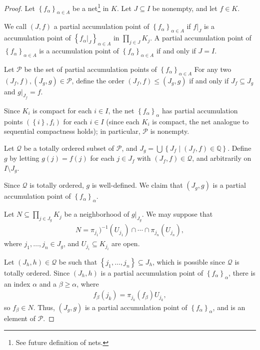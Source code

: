 \documentclass[10pt]{extarticle}
\newcommand{\Q}{\mathbb{Q}}
\newcommand{\set}[1]{\left\{#1\right\}}
\theoremstyle{plain}
\theoremstyle{definition}
\theoremstyle{note}
\renewcommand{\newline}{\hfill\break}
\begin{document}
\begin{proof}
  Let $\set{f_{\alpha}}_{\alpha\in A}$ be a net\footnote{See future definition of nets.} in $K$. Let $J\subseteq I$ be nonempty, and let $f\in K$.\newline

  We call $\left(J,f\right)$ a partial accumulation point of $\set{f_{\alpha}}_{\alpha \in A}$ if $f\vert_{J}$ is a accumulation point of $\set{f_{\alpha}\vert_{J}}_{\alpha \in A}$ in $\displaystyle \prod_{j\in J}K_j$. A partial accumulation point of $\set{f_{\alpha}}_{\alpha \in A}$ is a accumulation point of $\set{f_{\alpha}}_{\alpha\in A}$  if and only if $J = I$.\newline

  Let $\mathcal{P}$ be the set of partial accumulation points of $\set{f_{\alpha}}_{\alpha \in A}$ For any two $\left(J_f,f\right),\left(J_g,g\right)\in \mathcal{P}$, define the order $\left(J_f,f\right)\leq \left(J_g,g\right)$ if and only if $J_f\subseteq J_g$ and $g\vert_{J_f} = f$.\newline

  Since $K_i$ is compact for each $i\in I$, the net $\set{f_{\alpha}}_{\alpha}$ has partial accumulation points $\left(\set{i},f_i\right)$ for each $i\in I$ (since each $K_i$ is compact, the net analogue to sequential compactness holds); in particular, $\mathcal{P}$ is nonempty.\newline

  Let $\mathcal{Q}$ be a totally ordered subset of $\mathcal{P}$, and $J_g = \bigcup\set{J_f\mid \left(J_f,f\right)\in \Q}$. Define $g$ by letting $g(j) = f(j)$ for each $j\in J_f$ with $\left(J_f,f\right)\in \mathcal{Q}$, and arbitrarily on $I\setminus J_g$.\newline

  Since $\mathcal{Q}$ is totally ordered, $g$ is well-defined. We claim that $\left(J_g,g\right)$ is a partial accumulation point of $\set{f_{\alpha}}_{\alpha}$.\newline

  Let $\displaystyle N\subseteq \prod_{j\in J_g} K_j$ be a neighborhood of $g\vert_{J_g}$. We may suppose that
  \begin{align*}
    N = \pi_{j_1})^{-1}\left(U_{j_1}\right) \cap \cdots \cap \pi_{j_n}\left(U_{j_n}\right),
  \end{align*}
  where $j_1,\dots,j_n\in J_g$, and $U_{j_i} \subseteq K_{j_i}$ are open.\newline

  Let $\left(J_{h},h\right)\in \mathcal{Q}$ be such that $\set{j_1,\dots,j_n}\subseteq J_h$, which is possible since $\mathcal{Q}$ is totally ordered. Since $\left(J_h,h\right)$ is a partial accumulation point of $\set{f_{\alpha}}_{\alpha}$, there is an index $\alpha$ and a $\beta \geq \alpha$, where
  \begin{align*}
    f_{\beta}\left(j_k\right) = \pi_{j_k}\left(f_{\beta}\right)U_{j_k},
  \end{align*}
  so $f_{\beta}\in N$. Thus, $\left(J_g,g\right)$ is a partial accumulation point of $\set{f_{\alpha}}_{\alpha}$, and is an element of $\mathcal{P}$.\newline


\end{proof}
\end{document}
